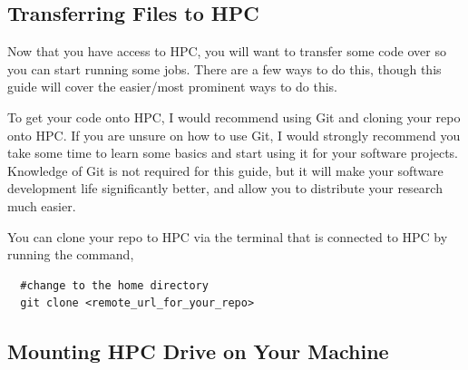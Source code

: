 \subsection{Transferring Files to HPC}
Now that you have access to HPC, you will want to transfer some code over so you can start running some jobs. There are a few ways to do this, though this guide will cover the easier/most prominent ways to do this.
%
%
\par
%
%
To get your code onto HPC, I would recommend using Git and cloning your repo onto HPC. If you are unsure on how to use Git, I would strongly recommend you take some time to learn some basics and start using it for your software projects. Knowledge of Git is not required for this guide, but it will make your software development life significantly better, and allow you to distribute your research much easier.
%
%
\par
%
%
You can clone your repo to HPC via the terminal that is connected to HPC by running the command,
\\
\par
\begin{verbatim}
  #change to the home directory
  git clone <remote_url_for_your_repo>
\end{verbatim}
%
%
\subsection{Mounting HPC Drive on Your Machine}
